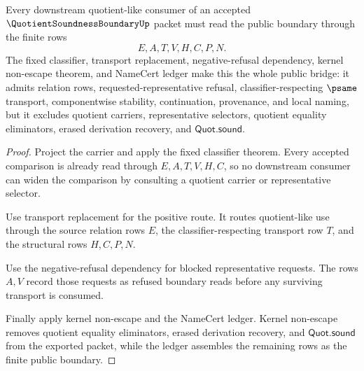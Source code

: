 \begin{theorem}
\label{thm:quotient-soundness-boundary-public-bridge}
Every downstream quotient-like consumer of an accepted $\QuotientSoundnessBoundaryUp$ packet must read the public boundary through the finite rows
$$
E,A,T,V,H,C,P,N.
$$
The fixed classifier, transport replacement, negative-refusal dependency, kernel non-escape theorem, and NameCert ledger make this the whole public bridge: it admits relation rows, requested-representative refusal, classifier-respecting $\psame$ transport, componentwise stability, continuation, provenance, and local naming, but it excludes quotient carriers, representative selectors, quotient equality eliminators, erased derivation recovery, and $\mathsf{Quot.sound}$.
\end{theorem}
\begin{proof}
Project the carrier and apply the fixed classifier theorem. Every accepted comparison is already read through $E,A,T,V,H,C$, so no downstream consumer can widen the comparison by consulting a quotient carrier or representative selector.

Use transport replacement for the positive route. It routes quotient-like use through the source relation rows $E$, the classifier-respecting transport row $T$, and the structural rows $H,C,P,N$.

Use the negative-refusal dependency for blocked representative requests. The rows $A,V$ record those requests as refused boundary reads before any surviving transport is consumed.

Finally apply kernel non-escape and the NameCert ledger. Kernel non-escape removes quotient equality eliminators, erased derivation recovery, and $\mathsf{Quot.sound}$ from the exported packet, while the ledger assembles the remaining rows as the finite public boundary.
\end{proof}

